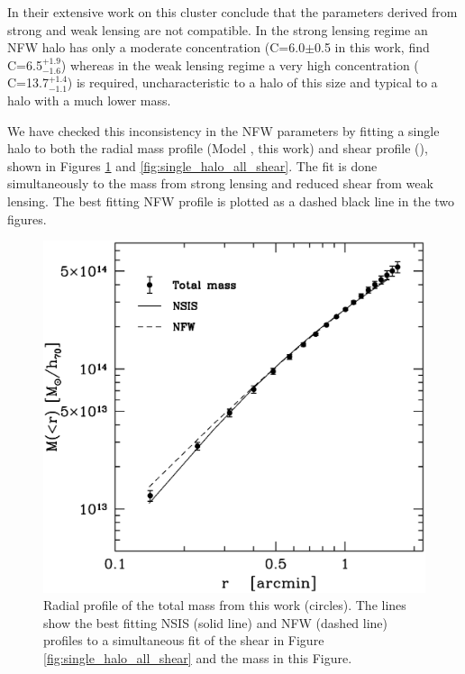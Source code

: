 \documentclass[useAMS,usenatbib]{mn2e}
\newcounter{one}   \setcounter{one}{1}
\newcounter{two}   \setcounter{two}{2}
\newcounter{three} \setcounter{three}{3}
\begin{document}
In their extensive work on this cluster
\citet{broadhurst:05,broadhurst:05b} conclude that the parameters
derived from strong and weak lensing are not compatible. In the strong
lensing regime an NFW halo has only a moderate concentration
(C=6.0$\pm$0.5 in this work, \citet{broadhurst:05} find
C=6.5$^{+1.9}_{-1.6}$) whereas in the weak lensing regime a very high
concentration (\citet{broadhurst:05b} C=13.7$^{+1.4}_{-1.1}$) is
required, uncharacteristic to a halo of this size and typical to a
halo with a much lower mass.

We have checked this inconsistency in the NFW parameters by fitting a
single halo to both the radial mass profile (Model , this
work) and shear profile (\citet{broadhurst:05b}), shown in Figures
\ref{fig:single_halo_all_mass} and
\ref{fig:single_halo_all_shear}. The fit is done simultaneously to the
mass from strong lensing and reduced shear from weak lensing. The best
fitting NFW profile is plotted as a dashed black line in the two
figures.

\begin{figure}
  \centering
  \includegraphics[width=\columnwidth]{figs/single_halo_gbbs_both_lin_mass.ps}
  \caption{ Radial profile of the total mass from this work
  (circles). The lines show the best fitting NSIS (solid line) and NFW
  (dashed line) profiles to a simultaneous fit of the shear in Figure
  \ref{fig:single_halo_all_shear} and the mass in this Figure. }
  \label{fig:single_halo_all_mass}
\end{figure}
\end{document}
